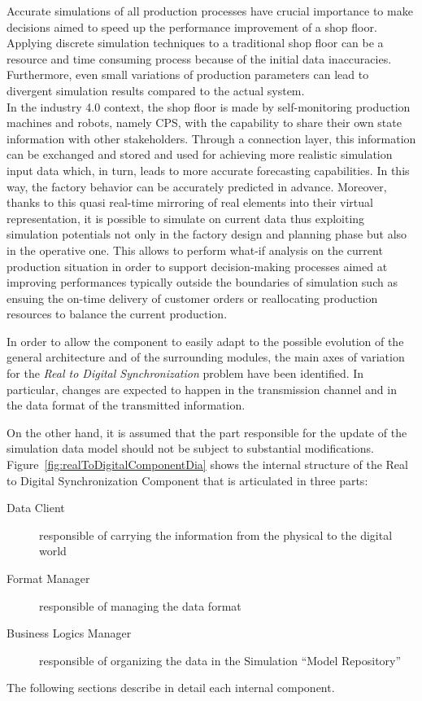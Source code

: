 Accurate simulations of all production processes have crucial importance to make decisions aimed to speed up the performance improvement of a shop floor. 
Applying discrete simulation techniques to a traditional shop floor can be a resource and time consuming process because of the initial data inaccuracies. 
Furthermore, even small variations of production parameters can lead to divergent simulation results compared to the actual system.\\
In the industry 4.0 context, the shop floor is made by self-monitoring production machines and robots, namely CPS, with the capability to share their own state information with other stakeholders. Through a connection layer, this information can be exchanged and stored and used for achieving more realistic simulation input data which, in turn, leads to more accurate forecasting capabilities. In this way, the factory behavior can be accurately predicted in advance. Moreover, thanks to this quasi real-time mirroring of real elements into their virtual representation, it is possible to simulate on current data thus exploiting simulation potentials not only in the factory design and planning phase but also in the operative one. This allows to perform what-if analysis on the current production situation in order to support decision-making processes aimed at improving performances typically outside the boundaries of simulation such as ensuing the on-time delivery of customer orders or reallocating production resources to balance the current production.

In order to allow the component to easily adapt to the possible evolution of the general architecture and of the surrounding modules, the main axes of variation for the \textit{Real to Digital Synchronization} problem have been identified. 
In particular, changes are expected to happen in the transmission channel and in the data format of the transmitted information.

On the other hand, it is assumed that the part responsible for the update of the simulation data model should not be subject to substantial modifications.\\
Figure~\ref{fig:realToDigitalComponentDia} shows the internal structure of the Real to Digital Synchronization Component that is articulated in three parts:
\begin{description}
\item[Data Client] responsible of carrying the information from the physical to the digital world
\item[Format Manager] responsible of managing the data format
\item[Business Logics Manager] responsible of organizing the data in the Simulation “Model Repository”
\end{description}
The following sections describe in detail each internal component.


